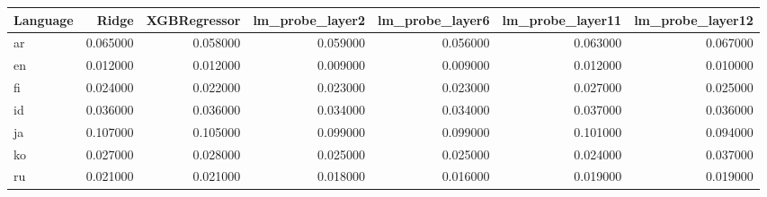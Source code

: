 \begin{tabular}{lrrrrrr}
\toprule
Language & Ridge & XGBRegressor & lm_probe_layer2 & lm_probe_layer6 & lm_probe_layer11 & lm_probe_layer12 \\
\midrule
ar & 0.065000 & 0.058000 & 0.059000 & 0.056000 & 0.063000 & 0.067000 \\
en & 0.012000 & 0.012000 & 0.009000 & 0.009000 & 0.012000 & 0.010000 \\
fi & 0.024000 & 0.022000 & 0.023000 & 0.023000 & 0.027000 & 0.025000 \\
id & 0.036000 & 0.036000 & 0.034000 & 0.034000 & 0.037000 & 0.036000 \\
ja & 0.107000 & 0.105000 & 0.099000 & 0.099000 & 0.101000 & 0.094000 \\
ko & 0.027000 & 0.028000 & 0.025000 & 0.025000 & 0.024000 & 0.037000 \\
ru & 0.021000 & 0.021000 & 0.018000 & 0.016000 & 0.019000 & 0.019000 \\
\bottomrule
\end{tabular}
